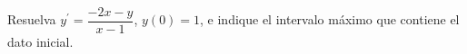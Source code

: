 Resuelva $y^{\prime}=\dfrac{-2x-y}{x-1}$, $y(0)=1$, e indique el intervalo máximo que contiene el dato inicial.
